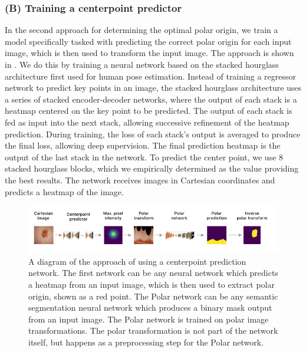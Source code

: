     \subsubsection{(B) Training a centerpoint predictor}
    \label{centerpoint-approach}
    
In the second approach for determining the optimal polar origin, we train a model specifically tasked with predicting the correct
polar origin for each input 
image, which is then used to transform the input image. The approach is shown in . 
We do this by training a neural network based on the stacked hourglass architecture 
\cite{newellStackedHourglassNetworks2016} first used for human pose estimation. Instead of training a regressor network to
predict key points in an image, the stacked hourglass architecture uses a series of stacked encoder-decoder networks, where the output
of each stack is a heatmap centered on the key point to be predicted. The output of each stack is fed as input into the next stack, allowing 
successive refinement of the heatmap prediction. During training, the loss of each stack's output is averaged to produce the final loss, 
allowing deep supervision. The final prediction heatmap is the output of the last stack in the network. To predict the center point, 
we use 8 stacked hourglass blocks, which we empirically determined as the value providing the best results. The network receives images in Cartesian 
coordinates and predicts a heatmap of the image.

	\begin{figure}[h]
		\centering
		\includegraphics[width=\linewidth]{images/4/centerpoint-approach}
		\caption{A diagram of the approach of using a centerpoint prediction network. The first network can be any neural network which predicts a heatmap from an input image, which is then used to extract polar origin, shown as a red point. The Polar network can be any semantic segmentation neural network which produces a binary mask output from an input image. The Polar network is trained on polar image transformations. The polar transformation is not part of the network itself, but happens as a preprocessing step for the Polar network.}
		\label{fig:centerpoint-approach}
	\end{figure}
 
